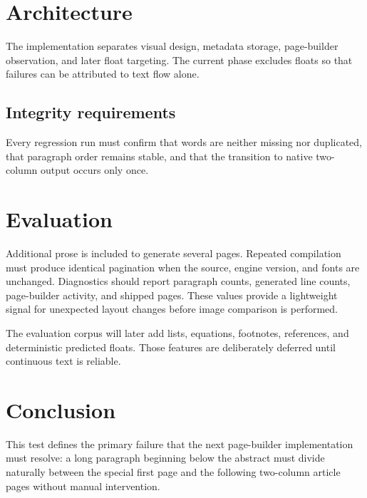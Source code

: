 \documentclass{tnqjournal}
\begin{document}
\section{Architecture}
The implementation separates visual design, metadata storage, page-builder observation, and later float targeting. The current phase excludes floats so that failures can be attributed to text flow alone.

\subsection{Integrity requirements}
Every regression run must confirm that words are neither missing nor duplicated, that paragraph order remains stable, and that the transition to native two-column output occurs only once.

\section{Evaluation}
Additional prose is included to generate several pages. Repeated compilation must produce identical pagination when the source, engine version, and fonts are unchanged. Diagnostics should report paragraph counts, generated line counts, page-builder activity, and shipped pages. These values provide a lightweight signal for unexpected layout changes before image comparison is performed.

The evaluation corpus will later add lists, equations, footnotes, references, and deterministic predicted floats. Those features are deliberately deferred until continuous text is reliable.

\section{Conclusion}
This test defines the primary failure that the next page-builder implementation must resolve: a long paragraph beginning below the abstract must divide naturally between the special first page and the following two-column article pages without manual intervention.
\end{document}
